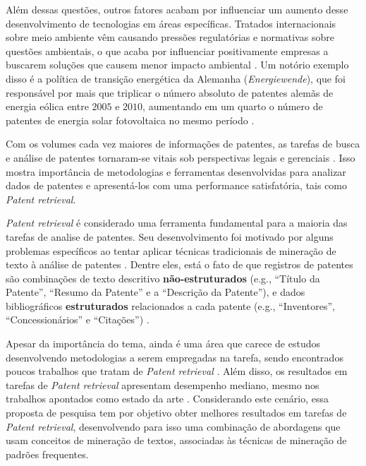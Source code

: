 \documentclass[12pt]{article}
\begin{document}
Além dessas questões, outros fatores acabam por influenciar um aumento desse desenvolvimento de tecnologias em áreas específicas. 
Tratados internacionais sobre meio ambiente vêm causando pressões regulatórias e normativas sobre questões ambientais, o que acaba por influenciar positivamente empresas a buscarem soluções que causem menor impacto ambiental \citep{berrone2013necessity}.
Um notório exemplo disso é a política de transição energética da Alemanha (\textit{Energiewende}), que foi responsável por mais que triplicar o número absoluto de patentes alemãs de energia eólica entre $2005$ e $2010$, aumentando em um quarto o número de patentes de energia solar fotovoltaica no mesmo período \citep{pegels2014germany}.

Com os volumes cada vez maiores de informações de patentes, as tarefas de busca e análise de patentes tornaram-se vitais sob perspectivas legais e gerenciais \citep{liu2011development}.
Isso mostra importância de metodologias e ferramentas desenvolvidas para analizar dados de patentes e apresentá-los com uma performance satisfatória, tais como \textit{Patent retrieval}.

\textit{Patent retrieval} é considerado uma ferramenta fundamental para a maioria das tarefas de analise de patentes. Seu desenvolvimento foi motivado por alguns problemas específicos ao tentar aplicar técnicas tradicionais de  mineração de texto à análise de patentes  \citep{shalaby2017patent}. 
Dentre eles, está o fato de que registros de patentes são combinações de texto descritivo \textbf{não-estruturados} (e.g., ``Título da Patente'', ``Resumo da Patente'' e a ``Descrição da Patente''), e dados bibliográficos \textbf{estruturados} relacionados a cada patente (e.g.,  ``Inventores'', ``Concessionários'' e ``Citações'') \citep{liu2011development} .

Apesar da importância do tema, ainda é uma área que carece de estudos desenvolvendo metodologias a serem empregadas na tarefa, sendo encontrados poucos trabalhos que tratam de \textit{Patent retrieval} \citep{abbas2014literature,shalaby2017patent}.
Além disso, os resultados em tarefas de \textit{Patent retrieval} apresentam desempenho mediano, mesmo nos trabalhos apontados como estado da arte \citep{shalaby2017patent}.
Considerando este cenário, essa proposta de pesquisa tem por objetivo obter melhores resultados em tarefas de \textit{Patent retrieval},  desenvolvendo para isso uma combinação de abordagens que usam conceitos de mineração de textos, associadas às técnicas de mineração de padrões frequentes.
\end{document}
